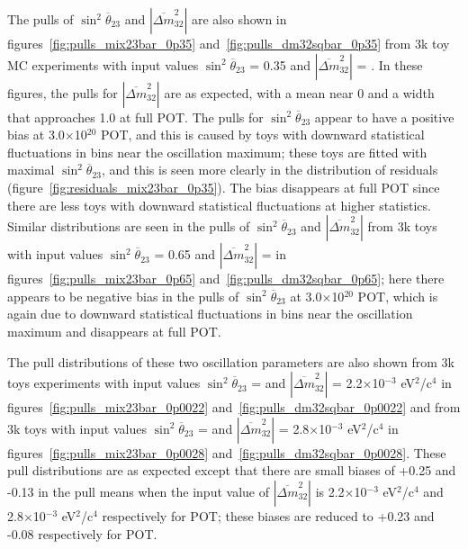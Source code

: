The pulls of $\sin^{2}\overline{\theta}_{23}$ and $|\overline{\Delta m}^2_{32}|$ are also shown in
figures~\ref{fig:pulls_mix23bar_0p35} and~\ref{fig:pulls_dm32sqbar_0p35} from 3k toy MC experiments with input values 
$\sin^{2}\overline{\theta}_{23}$ = 0.35 and $|\overline{\Delta m}^2_{32}|$ = \DmsqNH{}. In these figures, the pulls 
for $|\overline{\Delta m}^2_{32}|$ are as expected, with a mean near 0 and a width that approaches 1.0 at full POT.
The pulls for $\sin^{2}\overline{\theta}_{23}$ appear to have a positive bias at 3.0$\times$10$^{20}$ POT, and 
this is caused by toys with downward statistical fluctuations in bins near the oscillation maximum; these toys 
are fitted with maximal $\sin^{2}\overline{\theta}_{23}$, and this is seen more clearly in the distribution of 
residuals (figure~\ref{fig:residuals_mix23bar_0p35}). The bias disappears at full POT since there are less toys 
with downward statistical fluctuations at higher statistics. Similar distributions are seen in the pulls of 
$\sin^{2}\overline{\theta}_{23}$ and $|\overline{\Delta m}^2_{32}|$ from 3k toys with input values 
$\sin^{2}\overline{\theta}_{23}$ = 0.65 and $|\overline{\Delta m}^2_{32}|$ = \DmsqNH{} in
figures~\ref{fig:pulls_mix23bar_0p65} and~\ref{fig:pulls_dm32sqbar_0p65}; here there appears to be negative bias 
in the pulls of $\sin^{2}\overline{\theta}_{23}$ at 3.0$\times$10$^{20}$ POT, which is again due to downward 
statistical fluctuations in bins near the oscillation maximum and disappears at full POT. 

The pull distributions of these two oscillation parameters are also shown from 3k toys experiments with input values 
$\sin^{2}\overline{\theta}_{23}$ = \MixingTwoThreeNH{} and $|\overline{\Delta m}^2_{32}|$ = 2.2$\times$10$^{-3}$ 
eV$^{2}$/c$^{4}$ in figures~\ref{fig:pulls_mix23bar_0p0022} and~\ref{fig:pulls_dm32sqbar_0p0022} and from 3k toys 
with input values $\sin^{2}\overline{\theta}_{23}$ = \MixingTwoThreeNH{} and $|\overline{\Delta m}^2_{32}|$ = 
2.8$\times$10$^{-3}$ eV$^{2}$/c$^{4}$ in figures~\ref{fig:pulls_mix23bar_0p0028} and~\ref{fig:pulls_dm32sqbar_0p0028}. 
These pull distributions are as expected except that there are small biases of +0.25 and -0.13 in the pull means when the 
input value of $|\overline{\Delta m}^2_{32}|$ is 2.2$\times$10$^{-3}$ eV$^{2}$/c$^{4}$ and 2.8$\times$10$^{-3}$ eV$^{2}$/c$^{4}$ 
respectively for \TotalPot{} POT; these biases are reduced to +0.23 and -0.08 respectively for \TargetFullPot{} POT.   
 
%
% 

